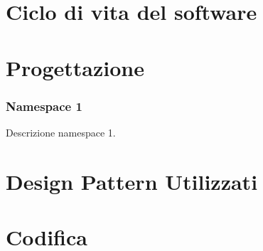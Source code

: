 \section{Ciclo di vita del software}\label{sec:ciclo-vita-software}

\section{Progettazione}\label{sec:progettazione}

\subsubsection{Namespace 1} %
Descrizione namespace 1.

\begin{namespacedesc}
\end{namespacedesc}


\section{Design Pattern Utilizzati}

\section{Codifica}
